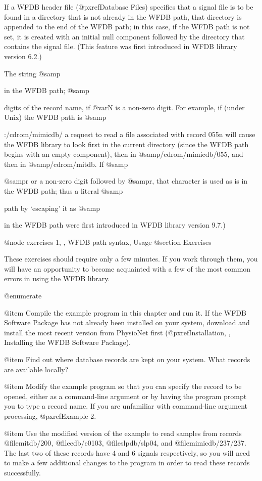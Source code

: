 {{If a WFDB header file (@pxref{Database Files}) specifies that a signal
file is to be found in a directory that is not already in the WFDB path,
that directory is appended to the end of the WFDB path; in this case, if
the WFDB path is not set, it is created with an initial null component
followed by the directory that contains the signal file.  (This feature
was first introduced in WFDB library version 6.2.)

The string @samp{%
in the WFDB path;  @samp{%
digits of the record name, if @var{N} is a non-zero digit.  For example,
if (under Unix) the WFDB path is @samp{:/cdrom/mimicdb/%
a request to read a file associated with record 055n will cause the WFDB
library to look first in the current directory (since the WFDB path begins
with an empty component), then in @samp{/cdrom/mimicdb/055}, and then in
@samp{/cdrom/mitdb}.  If @samp{%
@samp{r} or a non-zero digit followed by @samp{r}, that character is used
as is in the WFDB path;  thus a literal @samp{%
path by `escaping' it as @samp{%
in the WFDB path were first introduced in WFDB library version 9.7.)

@node     exercises 1, , WFDB path syntax, Usage
@section Exercises

These exercises should require only a few minutes.  If you work through
them, you will have an opportunity to become acquainted with a few of
the most common errors in using the WFDB library.

@enumerate

@item
Compile the example program in this chapter and run it.  If the WFDB
Software Package has not already been installed on your system,
download and install the most recent version from PhysioNet first
(@pxref{Installation, , Installing the WFDB Software Package}).

@item
Find out where database records are kept on your system.  What records
are available locally?

@item
Modify the example program so that you can specify the record to be
opened, either as a command-line argument or by having the program prompt
you to type a record name.  If you are unfamiliar with command-line
argument processing, @pxref{Example 2}.

@item
Use the modified version of the example to read samples from records
@file{mitdb/200}, @file{edb/e0103}, @file{slpdb/slp04}, and
@file{mimicdb/237/237}.  The last two of these records have 4 and 6 signals
respectively, so you will need to make a few additional changes to the program
in order to read these records successfully.

}}}}}}}}
